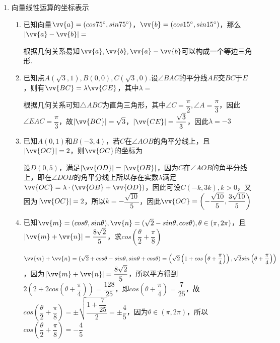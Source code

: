 \begin{enumerate}
    \item 向量线性运算的坐标表示
    \begin{enumerate}
        \item 已知向量$\vv{a} = (cos75^{\circ}, sin75^{\circ})$，$\vv{b} = (cos15^{\circ}, sin15^{\circ})$，那么$|\vv{a} - \vv{b}| = $
        \begin{jieda}
            根据几何关系易知$\vv{a}, \vv{b}, \vv{a} - \vv{b}$可以构成一个等边三角形.
        \end{jieda}
        \item 已知点$A(\sqrt{3}, 1), B(0, 0), C(\sqrt{3}, 0)$.设$\angle BAC$的平分线$AE$交$BC$于$E$，则有$\vv{BC} = \lambda \vv{CE}$，其中$\lambda = $
        \begin{jieda}
            根据几何关系可知$\triangle ABC$为直角三角形，其中$\angle C = \dfrac{\pi}{2}, \angle A = \dfrac{\pi}{3}$，因此$\angle EAC = \dfrac{\pi}{3}$，故$|\vv{BC}| = \sqrt{3}$，$|\vv{CE}| = \dfrac{\sqrt{3}}{3}$，因此$\lambda = -3$
        \end{jieda}
        \item 已知$A(0, 1)$和$B(-3, 4)$，若$C$在$\angle AOB$的角平分线上，且$|\vv{OC}| = 2$，则$\vv{OC}$的坐标为
        \begin{jieda}
            设$D(0, 5)$，满足$|\vv{OD}| = |\vv{OB}|$，因为$C$在$\angle AOB$的角平分线上，即在$\angle DOB$的角平分线上所以存在实数$\lambda$满足$\vv{OC} = \lambda \cdot (\vv{OB} + \vv{OD})$，因此可设$C(-k, 3k), k>0$，又因为$|\vv{OC}| = 2$，所以$k = -\dfrac{\sqrt{10}}{5}$，因此$\vv{OC} = \left(-\dfrac{\sqrt{10}}{5}, \dfrac{3\sqrt{10}}{5}\right)$
        \end{jieda}
        \item 已知$\vv{m} = (cos\theta, sin\theta), \vv{n} = (\sqrt{2} - sin\theta, cos\theta), \theta \in (\pi, 2\pi)$，且$|\vv{m} + \vv{n}| = \dfrac{8\sqrt{2}}{5}$，求$cos\left(\dfrac{\theta}{2}+\dfrac{\pi}{8}\right)$
        \begin{jieda}
            $\vv{m} + \vv{n} = (\sqrt{2} + cos\theta - sin\theta, sin\theta + cos\theta) = \left(\sqrt{2}\left(1 + cos\left(\theta+\dfrac{\pi}{4}\right)\right), \sqrt{2}sin\left(\theta+\dfrac{\pi}{4}\right)\right)$，因为$|\vv{m} + \vv{n}| = \dfrac{8\sqrt{2}}{5}$，所以平方得到$2\left(2+2cos\left(\theta+\dfrac{\pi}{4}\right)\right) = \dfrac{128}{25}$，即$cos\left(\theta+\dfrac{\pi}{4}\right) = \dfrac{7}{25}$，故$cos\left(\dfrac{\theta}{2}+\dfrac{\pi}{8}\right) = \pm \sqrt{\dfrac{1+\dfrac{7}{25}}{2}} = \pm \dfrac{4}{5}$，因为$\theta \in (\pi, 2\pi)$，所以$cos\left(\dfrac{\theta}{2}+\dfrac{\pi}{8}\right) = -\dfrac{4}{5}$

\end{jieda}
\end{enumerate}
\end{enumerate}
